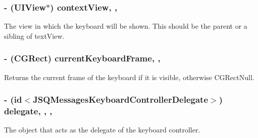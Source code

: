 \subsubsection[{context\+View}]{\setlength{\rightskip}{0pt plus 5cm}-\/ (U\+I\+View$\ast$) context\+View\hspace{0.3cm}{\ttfamily [read]}, {\ttfamily [nonatomic]}, {\ttfamily [weak]}}\label{interface_j_s_q_messages_keyboard_controller_a9af5df9417b929671f7a8228054bd988}
The view in which the keyboard will be shown. This should be the parent or a sibling of {\ttfamily text\+View}. \hypertarget{interface_j_s_q_messages_keyboard_controller_a890ae9c5de10661967ddbc8070f95e9b}{}
\subsubsection[{current\+Keyboard\+Frame}]{\setlength{\rightskip}{0pt plus 5cm}-\/ (C\+G\+Rect) current\+Keyboard\+Frame\hspace{0.3cm}{\ttfamily [read]}, {\ttfamily [nonatomic]}, {\ttfamily [assign]}}\label{interface_j_s_q_messages_keyboard_controller_a890ae9c5de10661967ddbc8070f95e9b}
Returns the current frame of the keyboard if it is visible, otherwise {\ttfamily C\+G\+Rect\+Null}. \hypertarget{interface_j_s_q_messages_keyboard_controller_ad0a23adc2f26a8243ded913b5ab905a4}{}
\subsubsection[{delegate}]{\setlength{\rightskip}{0pt plus 5cm}-\/ (id$<${\bf J\+S\+Q\+Messages\+Keyboard\+Controller\+Delegate}$>$) delegate\hspace{0.3cm}{\ttfamily [read]}, {\ttfamily [write]}, {\ttfamily [nonatomic]}, {\ttfamily [weak]}}\label{interface_j_s_q_messages_keyboard_controller_ad0a23adc2f26a8243ded913b5ab905a4}
The object that acts as the delegate of the keyboard controller. \hypertarget{interface_j_s_q_messages_keyboard_controller_abcd730af98f27ef8d6e9207200b7db74}{}
